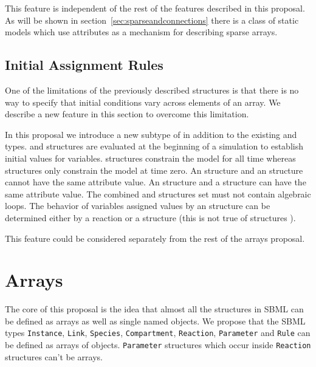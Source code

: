 \documentclass{cekarticle}
\begin{document}
This feature is independent of the rest of the features described in this proposal.
As will be shown in section~\ref{sec:sparseandconnections} there is a class of static models which use 
attributes as a mechanism for describing sparse arrays.

\subsection{Initial Assignment Rules}

One of the limitations of the previously described structures is that there is no way to 
specify that initial conditions vary across elements of an array.  We describe a new feature
in this section to overcome this limitation.

In this proposal we introduce a new subtype of   in addition
to the existing  and  types.  
 and  structures are evaluated at the beginning of a simulation to establish
initial values for variables.   structures constrain the model for all time
whereas  structures only constrain the model at time zero. 
An  structure and an  structure cannot have the same
 attribute value.  An  structure and a  structure can have the same
 attribute value.  The combined  and  structures
set must not contain algebraic loops.  The behavior of variables assigned values by an
 structure can be determined either by a reaction  or a  structure (this is not
true of  structures ).

This feature could be considered separately from the rest of the arrays proposal.

\section{Arrays}
\label{sec:arrays}

The core of this proposal is the idea that almost all the
structures in SBML can be defined as arrays as well as single
named objects.  We propose that the SBML types
\texttt{Instance}, \texttt{Link}, \texttt{Species}, \texttt{Compartment}, \texttt{Reaction},
\texttt{Parameter} and \texttt{Rule} can be defined as arrays of
objects. \texttt{Parameter} structures which occur inside \texttt{Reaction} structures can't
be arrays.
\end{document}
